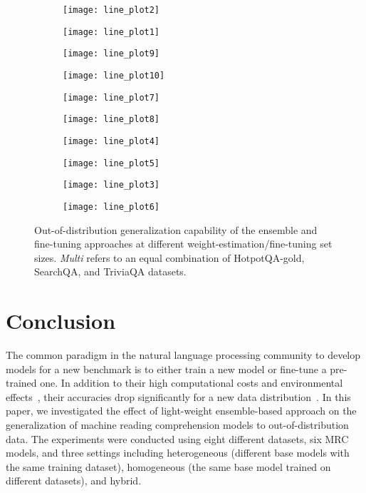\documentclass[review]{elsarticle}
\begin{document}
\begin{figure}[!htbp]
\centering
\begin{subfigure}[b]{.45\linewidth}
\texttt{[image: line\_plot2]} 
\end{subfigure}
\begin{subfigure}[b]{.45\linewidth}
\texttt{[image: line\_plot1]} 
\end{subfigure}
\begin{subfigure}[b]{.45\linewidth}
\texttt{[image: line\_plot9]} 
\end{subfigure}
\begin{subfigure}[b]{.45\linewidth}
\texttt{[image: line\_plot10]} 
\end{subfigure}
\begin{subfigure}[b]{.45\linewidth}
\texttt{[image: line\_plot7]} 
\end{subfigure}
\begin{subfigure}[b]{.45\linewidth}
\texttt{[image: line\_plot8]} 
\end{subfigure}
\begin{subfigure}[b]{.45\linewidth}
\texttt{[image: line\_plot4]} 
\end{subfigure}
\begin{subfigure}[b]{.45\linewidth}
\texttt{[image: line\_plot5]} 
\end{subfigure}
\begin{subfigure}[b]{.45\linewidth}
\texttt{[image: line\_plot3]} 
\end{subfigure}
\begin{subfigure}[b]{.45\linewidth}
\texttt{[image: line\_plot6]} 
\end{subfigure}
\caption{Out-of-distribution generalization capability of the ensemble and fine-tuning approaches at different weight-estimation/fine-tuning set sizes. \textit{Multi} refers to an equal combination of HotpotQA-gold, SearchQA, and TriviaQA datasets.}
\label{fig:generalization}
\end{figure}

\section{Conclusion}
The common paradigm in the natural language processing community to develop models for a new benchmark is to either train a new model or fine-tune a pre-trained one. In addition to their high computational costs and environmental effects~\citep{RN212}, their accuracies drop significantly for a new data distribution~\citep{talmor-berant-2019-multiqa}. 
In this paper, we investigated the effect of light-weight ensemble-based approach on the generalization of machine reading comprehension models to out-of-distribution data. The experiments were conducted using eight different datasets, six MRC models, and three settings including heterogeneous (different base models with the same training dataset), homogeneous (the same base model trained on different datasets), and hybrid. 
\end{document}
